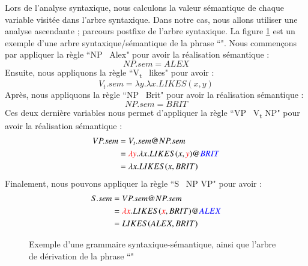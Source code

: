 \documentclass{KodeBook}
\begin{document}
Lors de l'analyse syntaxique, nous calculons la valeur sémantique de chaque variable visitée dans l'arbre syntaxique.
Dans notre cas, nous allons utiliser une analyse ascendante ; parcours postfixe de l'arbre syntaxique.
La figure \ref{fig:arbre-sem1} est un exemple d'une arbre syntaxique/sémantique de la phrase ``".
Nous commençons par appliquer la règle ``NP \textrightarrow\ Alex" pour avoir la réalisation sémantique : 
\[NP.sem = ALEX\]
Ensuite, nous appliquons la règle ``V\textsubscript{t} \textrightarrow\ likes" pour avoir :
\[V_t.sem = \lambda y.\lambda x.LIKES(x, y)\]
Après, nous appliquons la règle ``NP \textrightarrow\ Brit" pour avoir la réalisation sémantique : 
\[NP.sem = BRIT\]
Ces deux dernière variables nous permet d'appliquer la règle ``VP \textrightarrow\ V\textsubscript{t} NP" pour avoir la réalisation sémantique :
\begin{align*}
 VP.sem & = V_t.sem@NP.sem \\
        & = \textcolor{red}{\lambda y}.\lambda x.LIKES(x, \textcolor{red}{y})@\textcolor{blue}{BRIT}\\
        & = \lambda x.LIKES(x, BRIT)
\end{align*}
Finalement, nous pouvons appliquer la règle ``S \textrightarrow\ NP VP" pour avoir :
\begin{align*}
S.sem & = VP.sem@NP.sem \\
       & = \textcolor{red}{\lambda x}.LIKES(\textcolor{red}{x}, BRIT)@\textcolor{blue}{ALEX}\\
       & = LIKES(ALEX, BRIT)
\end{align*}

\begin{figure}[ht]
	\centering
	\caption[Exemple d'une grammaire syntaxique-sémantique et une dérivation]{Exemple d'une grammaire syntaxique-sémantique, ainsi que l'arbre de dérivation de la phrase ``" \cite{2018-eisenstein}}
	\label{fig:arbre-sem1}
\end{figure}
\end{document}
